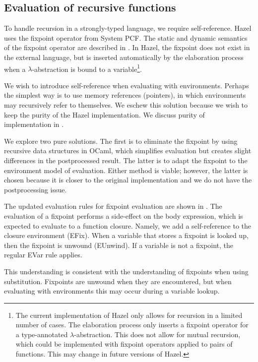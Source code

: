 \subsection{Evaluation of recursive functions}
\label{sec:rec_impl}

To handle recursion in a strongly-typed language, we require self-reference. Hazel uses the fixpoint operator from System PCF. The static and dynamic semantics of the fixpoint operator are described in . In Hazel, the fixpoint does not exist in the external language, but is inserted automatically by the elaboration process when a $\lambda$-abstraction is bound to a variable\footnote{The current implementation of Hazel only allows for recursion in a limited number of cases. The elaboration process only inserts a fixpoint operator for a type-annotated $\lambda$-abstraction. This does not allow for mutual recursion, which could be implemented with fixpoint operators applied to pairs of functions. This may change in future versions of Hazel.}.

We wish to introduce self-reference when evaluating with environments. Perhaps the simplest way is to use memory references (pointers), in which environments may recursively refer to themselves. We eschew this solution because we wish to keep the purity of the Hazel implementation. We discuss purity of implementation in .

We explore two pure solutions. The first is to eliminate the fixpoint by using recursive data structures in OCaml, which simplifies evaluation but creates slight differences in the postprocessed result. The latter is to adapt the fixpoint to the environment model of evaluation. Either method is viable; however, the latter is chosen because it is closer to the original implementation and we do not have the postprocessing issue.

The updated evaluation rules for fixpoint evaluation are shown in . The evaluation of a fixpoint performs a side-effect on the body expression, which is expected to evaluate to a function closure. Namely, we add a self-reference to the closure environment (EFix). When a variable that stores a fixpoint is looked up, then the fixpoint is unwound (EUnwind). If a variable is not a fixpoint, the regular EVar rule applies.

This understanding is consistent with the understanding of fixpoints when using substitution. Fixpoints are unwound when they are encountered, but when evaluating with environments this may occur during a variable lookup.

